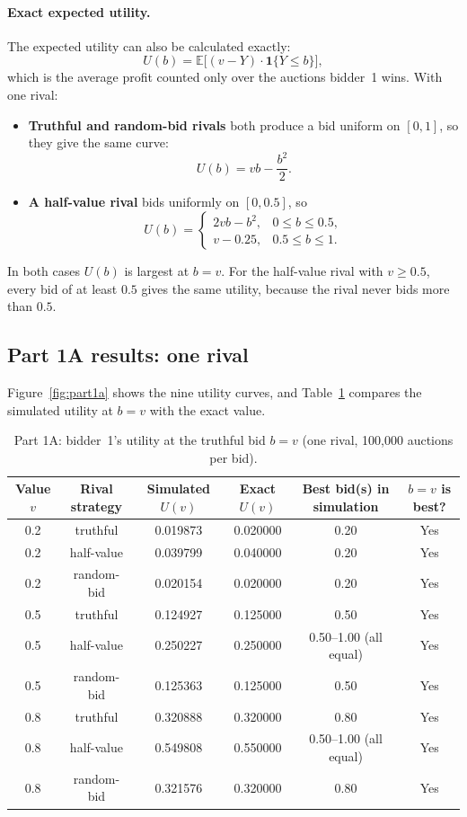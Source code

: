 \documentclass[11pt,a4paper]{article}
\begin{document}
\paragraph{Exact expected utility.} The expected utility can also be calculated exactly:
\[
  U(b)=\mathbb{E}\big[(v-Y)\cdot\mathbf{1}\{Y\leq b\}\big],
\]
which is the average profit counted only over the auctions bidder~1 wins. With one rival:
\begin{itemize}
  \item \textbf{Truthful and random-bid rivals} both produce a bid uniform on $[0,1]$, so they give the same curve:
  \[
    U(b)=vb-\frac{b^2}{2}.
  \]
  \item \textbf{A half-value rival} bids uniformly on $[0,0.5]$, so
  \[
    U(b)=
    \begin{cases}
      2vb-b^2, & 0\leq b\leq 0.5,\\
      v-0.25, & 0.5\leq b\leq 1.
    \end{cases}
  \]
\end{itemize}
In both cases $U(b)$ is largest at $b=v$. For the half-value rival with $v\geq0.5$, every bid of at least $0.5$ gives the same utility, because the rival never bids more than $0.5$.

\subsection{Part 1A results: one rival}
\label{sec:part1a}

Figure~\ref{fig:part1a} shows the nine utility curves, and Table~\ref{tab:part1a} compares the simulated utility at $b=v$ with the exact value.

\begin{table}[H]
\centering
\caption{Part 1A: bidder~1's utility at the truthful bid $b=v$ (one rival, 100,000 auctions per bid).}
\label{tab:part1a}
\small
\begin{tabular}{cccccc}
\toprule
Value $v$ & Rival strategy & Simulated $U(v)$ & Exact $U(v)$ & Best bid(s) in simulation & $b=v$ is best?\\
\midrule
0.2 & truthful   & 0.019873 & 0.020000 & 0.20 & Yes\\
0.2 & half-value & 0.039799 & 0.040000 & 0.20 & Yes\\
0.2 & random-bid & 0.020154 & 0.020000 & 0.20 & Yes\\
0.5 & truthful   & 0.124927 & 0.125000 & 0.50 & Yes\\
0.5 & half-value & 0.250227 & 0.250000 & 0.50--1.00 (all equal) & Yes\\
0.5 & random-bid & 0.125363 & 0.125000 & 0.50 & Yes\\
0.8 & truthful   & 0.320888 & 0.320000 & 0.80 & Yes\\
0.8 & half-value & 0.549808 & 0.550000 & 0.50--1.00 (all equal) & Yes\\
0.8 & random-bid & 0.321576 & 0.320000 & 0.80 & Yes\\
\bottomrule
\end{tabular}
\end{table}
\end{document}
